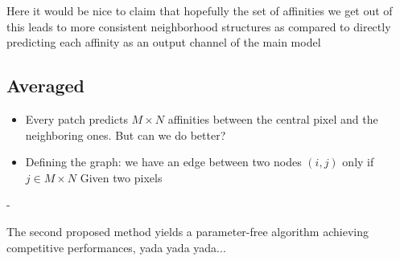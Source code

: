 Here it would be nice to claim that hopefully the set of affinities we get out of this leads to more consistent neighborhood structures as compared to directly predicting each affinity as an output channel of the main model

\subsection{Averaged }\label{sec:prob_affs}
\begin{itemize}
\item Every patch predicts $M\times N$ affinities between the central pixel and the neighboring ones. But can we do better?
\item Defining the graph: we have an edge between two nodes $(i, j)$ only if $j \in M\times N$ Given two pixels  
\end{itemize}
- 


The second proposed method yields a parameter-free algorithm achieving competitive performances, yada yada yada... 



